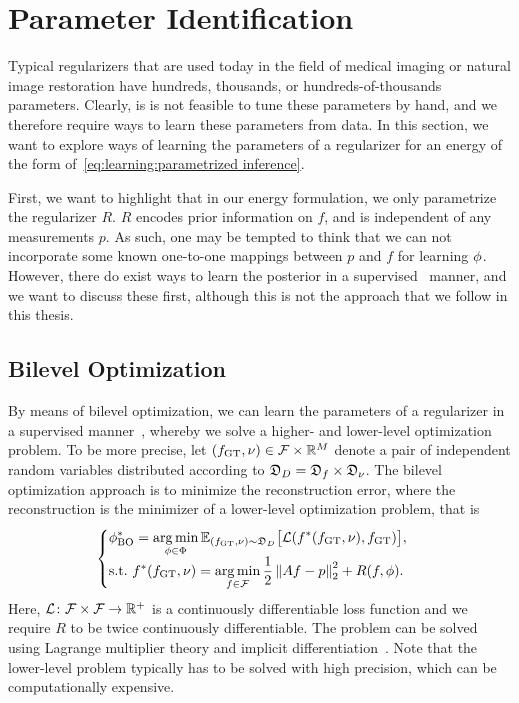 \documentclass[../ml-ct.tex]{subfiles}
\begin{document}
\section{Parameter Identification}
Typical regularizers that are used today in the field of medical imaging or natural image restoration have hundreds, thousands, or hundreds-of-thousands parameters.
Clearly, is is not feasible to tune these parameters by hand, and we therefore require ways to learn these parameters from data.
In this section, we want to explore ways of learning the parameters of a regularizer for an energy of the form of~\cref{eq:learning:parametrized inference}.

First, we want to highlight that in our energy formulation, we only parametrize the regularizer \( R \).
\( R \) encodes prior information on \( f \), and is independent of any measurements \( p \).
As such, one may be tempted to think that we can not incorporate some known one-to-one mappings between \( p \) and \( f \) for learning \( \phi \).
However, there do exist ways to learn the posterior in a supervised~\cite{bishop_pattern_2006,murphy_machine_2012} manner, and we want to discuss these first, although this is not the approach that we follow in this thesis.
\subsection{Bilevel Optimization}
By means of bilevel optimization, we can learn the parameters of a regularizer in a supervised manner~\cite{kunisch_bilevel_2013}, whereby we solve a higher- and lower-level optimization problem.
To be more precise, let \( (f_\text{GT}, \nu) \in \mathcal{F} \times \mathbb{R}^M \) denote a pair of independent random variables distributed according to \( \mathfrak{D}_{D} = \mathfrak{D}_{f} \times \mathfrak{D}_{\nu} \).
The bilevel optimization approach is to minimize the reconstruction error, where the reconstruction is the minimizer of a lower-level optimization problem, that is
\begin{equation}
	\begin{cases}
		\displaystyle \phi^*_{\text{BO}} = \operatorname*{arg\,min}_{\phi \in \Phi} \mathbb{E}_{(f_\text{GT}, \nu) \sim \mathfrak{D}_{D}} \bigl[ \mathcal{L}(f^*_{\text{}}(f_\text{GT}, \nu), f_\text{GT}) \bigr], \\
		\displaystyle \text{s.t.}\ f^*_{\text{}}(f_\text{GT}, \nu) = \operatorname*{arg\,min}_{f \in \mathcal{F}} \frac{1}{2} \left\lVert Af - p\right\rVert_2^2 + R(f, \phi).
	\end{cases}
\end{equation}
Here, \( \mathcal{L}\colon\mathcal{F} \times \mathcal{F}\to\mathbb{R}^+ \) is a continuously differentiable loss function and we require \( R \) to be twice continuously differentiable.
The problem can be solved using Lagrange multiplier theory and implicit differentiation~\cite{samuel_learning_2009}.
Note that the lower-level problem typically has to be solved with high precision, which can be computationally expensive.
\end{document}
